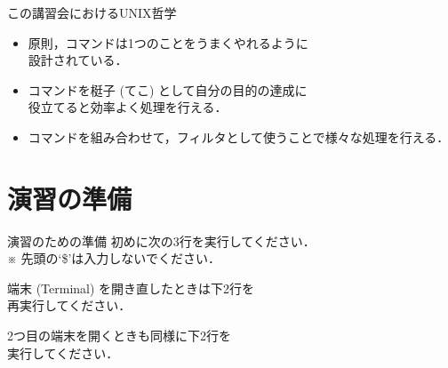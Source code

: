 \documentclass[uplatex, dvipdfmx, 12pt]{beamer}
\begin{document}
\begin{frame}{この講習会におけるUNIX哲学}
  \begin{itemize}
    \setlength\itemsep{2em}
    \item 原則，コマンドは1つのことをうまくやれるように\\設計されている．
    \item コマンドを梃子 (てこ) として自分の目的の達成に\\役立てると効率よく処理を行える．
    \item コマンドを組み合わせて，フィルタとして使うことで様々な処理を行える．
  \end{itemize}
\end{frame}

\section{演習の準備}


\begin{frame}{演習のための準備}
  初めに次の3行を実行してください．\\
  ※ 先頭の`\$'は入力しないでください．
  \vspace{1em}

  \begin{tcolorbox}
  \lstInit
  \end{tcolorbox}

  \vspace{1em}
  端末 (Terminal) を開き直したときは下2行を\\
  再実行してください．

  2つ目の端末を開くときも同様に下2行を\\実行してください．
\end{frame}
\end{document}
